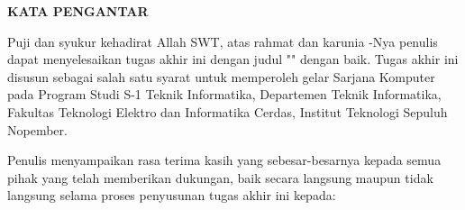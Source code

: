 \begin{center}
  \Large
  \textbf{KATA PENGANTAR}
\end{center}


\vspace{2ex}


Puji dan syukur kehadirat Allah SWT, atas rahmat dan karunia -Nya penulis dapat menyelesaikan tugas akhir ini dengan judul "\tatitle{}" dengan baik. Tugas akhir ini disusun sebagai salah satu syarat untuk memperoleh gelar Sarjana Komputer pada Program Studi S-1 Teknik Informatika, Departemen Teknik Informatika, Fakultas Teknologi Elektro dan Informatika Cerdas, Institut Teknologi Sepuluh Nopember. 

Penulis menyampaikan rasa terima kasih yang sebesar-besarnya kepada semua pihak yang telah memberikan dukungan, baik secara langsung maupun tidak langsung selama proses penyusunan tugas akhir ini kepada:


